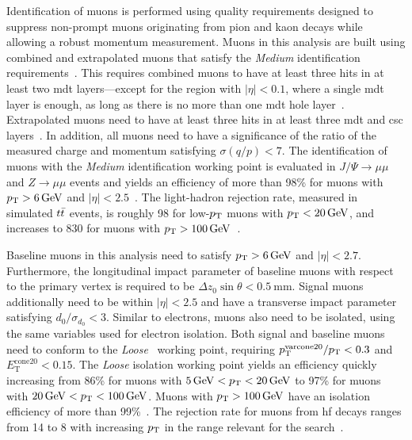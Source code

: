 Identification of muons is performed using quality requirements designed to suppress non-prompt muons originating from pion and kaon decays while allowing a robust momentum measurement.
Muons in this analysis are built using combined and extrapolated muons that satisfy the \textit{Medium} identification requirements~\cite{PERF-2015-10}.
This requires combined muons to have at least three hits in at least two \gls{mdt} layers---except for the region with $\vert\eta\vert < 0.1$, where a single \gls{mdt} layer is enough, as long as there is no more than one \gls{mdt} hole layer~\cite{Aad:2020gmm}.
Extrapolated muons need to have at least three hits in at least three \gls{mdt} and \gls{csc} layers~\cite{Aad:2020gmm}.
In addition, all muons need to have a significance of the ratio of the measured charge and momentum satisfying $\sigma(q/p) < 7$.
The identification of muons with the \textit{Medium} identification working point is evaluated in $J/\Psi\rightarrow\mu\mu$ and $Z\rightarrow\mu\mu$ events and yields an efficiency of more than 98\% for muons with $\pt > \SI{6}{\GeV}$ and $\vert\eta\vert < 2.5$~\cite{Aad:2020gmm}.
The light-hadron rejection rate, measured in simulated $t\bar{t}$ events, is roughly 98 for low-$p_{\textrm{T}}$ muons with $\pt < \SI{20}{\GeV}$, and increases to 830 for muons with $\pt > \SI{100}{\GeV}$~\cite{Aad:2020gmm}.

Baseline muons in this analysis need to satisfy $\pt > \SI{6}{\GeV}$ and $\vert\eta\vert < 2.7$. Furthermore, the longitudinal impact parameter of baseline muons with respect to the primary vertex is required to be $\Delta z_0\sin\theta < \SI{0.5}{\milli\meter}$.
Signal muons additionally need to be within $\vert\eta\vert < 2.5$ and have a transverse impact parameter satisfying $d_0/\sigma_{d_0} < 3$. Similar to electrons, muons also need to be isolated, using the same variables used for electron isolation.
Both signal and baseline muons need to conform to the \textit{Loose}~\cite{Aad:2020gmm} working point, requiring $p_{\mathrm{T}}^{\mathrm{varcone20}}/p_{\textrm{T}} < 0.3$ and $E_{\mathrm{T}}^{\mathrm{cone20}} < 0.15$.
The \textit{Loose} isolation working point yields an efficiency quickly increasing from 86\% for muons with $\SI{5}{\GeV} < \pt < \SI{20}{\GeV}$ to 97\% for muons with $\SI{20}{\GeV} < \pt < \SI{100}{\GeV}$.
Muons with $\pt > \SI{100}{\GeV}$ have an isolation efficiency of more than 99\%~\cite{Aad:2020gmm}. The rejection rate for muons from \gls{hf} decays ranges from 14 to 8 with increasing $p_{\textrm{T}}$ in the range relevant for the \onelepton search~\cite{Aad:2020gmm}.

